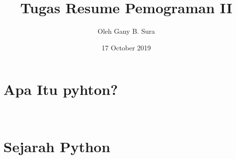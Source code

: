 \documentclass{article}
\title{Tugas Resume Pemograman II}
\author{Oleh Gany B. Sura }
\date{17 October 2019}
\begin{document}
\maketitle

\section{Apa Itu pyhton?}
\usepackage{Python merupakan bahasa pemrograman tingkat tinggi serta multiguna dimana perancangan berfokus padabagaimana kode terbaca.Bahasa pemograman Python disebut sebagai bahasa yang kemampuan yang dapat menggabungkan kapabilitas dengan sintaksis kode yang jelas dengan dilengkapi fungsionalitas pustaka standar.}\\

\usepackage{python juga merupakan bahasa pemograman scripting yang memiliki tingkat tinggi, interpreted, interactive, dan berorientais objek.  Python dibentuk dengan desain yang sangat mudah di baca dan dipahami, karena sama seperti bahasa pemograman yang lainnya yaitu dengan menggunakan kata bahasa inggris. Selain itu juga lebih sedikit dalam penggunaan rumus atau syntac.}

\section{Sejarah Python}
\usepackage{Sejarah penemuan Python berawal dari orang keturunan Belanda yaitu Guido van Rossum.Pembuatan bahasa pemograman python ini berlangsung di kota Amsterdam, Belanda pada tahun 1990. Pada tahun 1995 Python dikembangkan lagi agar lebih kompatibel oleh Guido Van Rossum. Kemudian pada awal tahun 2000, terdapat pembaharuan versi Python hingga mencapai Versi 3 sampai saat ini. nama Python sendiri diambil dari sebuah acara televisi yang lumayan terkenal yang bernama Mothy Python Flying Circus yang merupakan acara sirkus favorit dari Guido van Rossum. }
\usepackage{Awalnya, pembuatan bahasa pemrograman ini adalah untuk membuat skrip bahasa tingkat tinggi pada sebuah sistem operasi yang terdistribusi Amoeba. Python telah digunakan oleh beberapa pengembang dan bahkan digunakan oleh beberapa perusahaan untuk pembuatan perangkat lunak komersial.}
\end{document}
